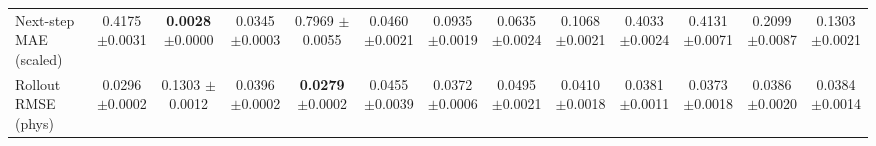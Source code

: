 \begin{table}[t]
{\begin{tabular}{lcccccccccccc}
Next-step MAE (scaled) & \makecell{0.4175\\[-2pt]{\scriptsize$\pm$0.0031}} & \makecell{\textbf{0.0028}\\[-2pt]{\scriptsize$\pm$0.0000}} & \makecell{0.0345\\[-2pt]{\scriptsize$\pm$0.0003}} & \makecell{0.7969\\[-2pt]{\scriptsize$\pm$0.0055}} & \makecell{0.0460\\[-2pt]{\scriptsize$\pm$0.0021}} & \makecell{0.0935\\[-2pt]{\scriptsize$\pm$0.0019}} & \makecell{0.0635\\[-2pt]{\scriptsize$\pm$0.0024}} & \makecell{0.1068\\[-2pt]{\scriptsize$\pm$0.0021}} & \makecell{0.4033\\[-2pt]{\scriptsize$\pm$0.0024}} & \makecell{0.4131\\[-2pt]{\scriptsize$\pm$0.0071}} & \makecell{0.2099\\[-2pt]{\scriptsize$\pm$0.0087}} & \makecell{0.1303\\[-2pt]{\scriptsize$\pm$0.0021}} \\
Rollout RMSE (phys) & \makecell{0.0296\\[-2pt]{\scriptsize$\pm$0.0002}} & \makecell{0.1303\\[-2pt]{\scriptsize$\pm$0.0012}} & \makecell{0.0396\\[-2pt]{\scriptsize$\pm$0.0002}} & \makecell{\textbf{0.0279}\\[-2pt]{\scriptsize$\pm$0.0002}} & \makecell{0.0455\\[-2pt]{\scriptsize$\pm$0.0039}} & \makecell{0.0372\\[-2pt]{\scriptsize$\pm$0.0006}} & \makecell{0.0495\\[-2pt]{\scriptsize$\pm$0.0021}} & \makecell{0.0410\\[-2pt]{\scriptsize$\pm$0.0018}} & \makecell{0.0381\\[-2pt]{\scriptsize$\pm$0.0011}} & \makecell{0.0373\\[-2pt]{\scriptsize$\pm$0.0018}} & \makecell{0.0386\\[-2pt]{\scriptsize$\pm$0.0020}} & \makecell{0.0384\\[-2pt]{\scriptsize$\pm$0.0014}} \\

\end{tabular}}
\end{table}
